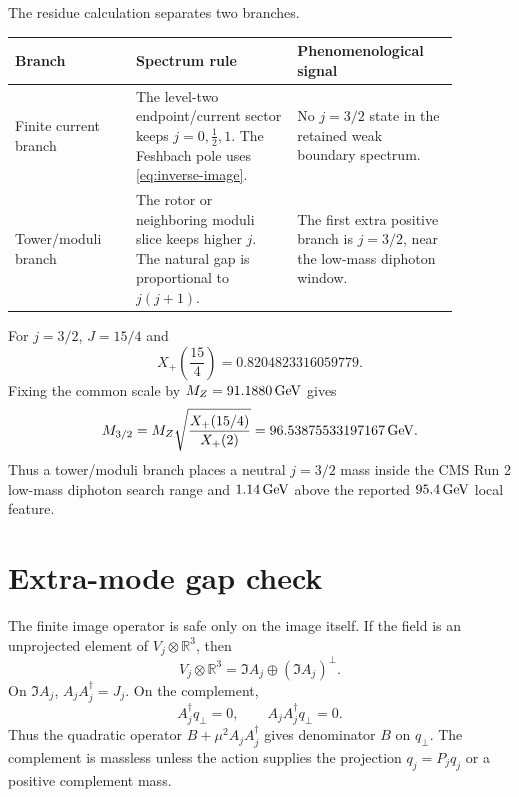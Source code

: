 \documentclass[11pt]{article}
\theoremstyle{plain}
\theoremstyle{definition}
\begin{document}
The residue calculation separates two branches.

\begin{center}
\small
\begin{tabular}{@{}>{\raggedright\arraybackslash}p{0.24\linewidth}
>{\raggedright\arraybackslash}p{0.32\linewidth}
>{\raggedright\arraybackslash}p{0.32\linewidth}@{}}
\hline
Branch & Spectrum rule & Phenomenological signal\\
\hline
Finite current branch &
The level-two endpoint/current sector keeps \(j=0,\frac12,1\).  The Feshbach
pole uses \eqref{eq:inverse-image}. &
No \(j=3/2\) state in the retained weak boundary spectrum.\\
Tower/moduli branch &
The rotor or neighboring moduli slice keeps higher \(j\).  The natural gap is
proportional to \(j(j+1)\). &
The first extra positive branch is \(j=3/2\), near the low-mass diphoton window.\\
\hline
\end{tabular}
\end{center}

For \(j=3/2\), \(J=15/4\) and
\begin{equation}
  X_+\!\left(\frac{15}{4}\right)=0.8204823316059779.
  \label{eq:x32}
\end{equation}
Fixing the common scale by \(M_Z=91.1880\,{\rm GeV}\) gives
\begin{equation}
  M_{3/2}
  =
  M_Z\sqrt{\frac{X_+(15/4)}{X_+(2)}}
  =
  96.53875533197167\,{\rm GeV}.
  \label{eq:m32}
\end{equation}
Thus a tower/moduli branch places a neutral \(j=3/2\) mass inside the CMS Run 2
low-mass diphoton search range and \(1.14\,{\rm GeV}\) above the reported
\(95.4\,{\rm GeV}\) local feature.

\section{Extra-mode gap check}

The finite image operator is safe only on the image itself.  If the field is an
unprojected element of \(V_j\otimes\mathbb R^3\), then
\[
  V_j\otimes\mathbb R^3=\Im A_j\oplus(\Im A_j)^\perp .
\]
On \(\Im A_j\), \(A_jA_j^\dagger=J_j\).  On the complement,
\[
  A_j^\dagger q_\perp=0,
  \qquad
  A_jA_j^\dagger q_\perp=0.
\]
Thus the quadratic operator \(B+\mu^2A_jA_j^\dagger\) gives denominator \(B\)
on \(q_\perp\).  The complement is massless unless the action supplies the
projection \(q_j=P_jq_j\) or a positive complement mass.
\end{document}
